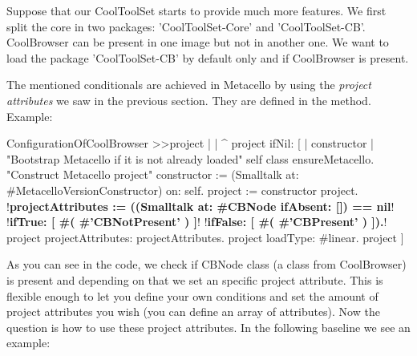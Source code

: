 \documentclass[a4paper,10pt,twoside]{book}
\begin{document}
Suppose that our CoolToolSet starts to provide much more features. We first split the core in two packages: 'CoolToolSet-Core' and 'CoolToolSet-CB'. CoolBrowser can be present in one image but not in another one. We want to load the package 'CoolToolSet-CB' by default only and if CoolBrowser is present. 

The mentioned conditionals are achieved in Metacello by using the \emph{project attributes} we saw in the previous section. They are defined in the  method. 
Example:


\begin{code}{}
ConfigurationOfCoolBrowser >>project
       |  | 
       ^ project ifNil: [ | constructor |
              "Bootstrap Metacello if it is not already loaded"
              self class ensureMetacello.
              "Construct Metacello project"
              constructor := (Smalltalk at: #MetacelloVersionConstructor) on: self.
              project := constructor project.
              !\textbf{projectAttributes :=  ((Smalltalk at: \#CBNode ifAbsent: []) == nil}!
                    !\textbf{ifTrue: [ \#( \#'CBNotPresent' ) ]}!
                    !\textbf{ifFalse: [ \#( \#'CBPresent' ) ]).}!              
              project projectAttributes:  projectAttributes.
              project loadType: #linear.
              project ]

\end{code}

As you can see in the code, we check if CBNode class (a class from CoolBrowser) is present and depending on that we set an specific project attribute.
This is flexible enough to let you define your own conditions and set the amount of project attributes you wish (you can define an array of attributes).  
Now the question is how to use these project attributes. In the following baseline we see an example:
\end{document}
